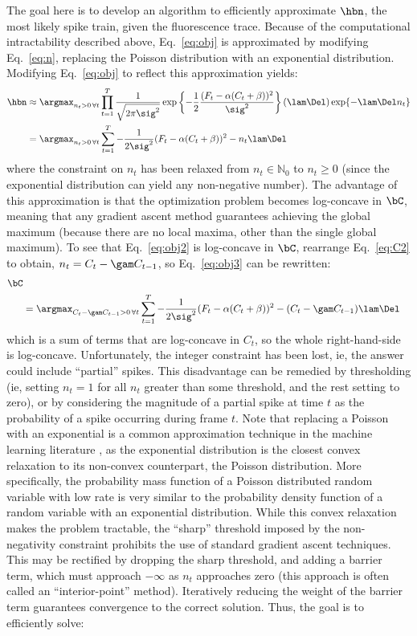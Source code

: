 The goal here is to develop an algorithm to efficiently approximate $\hbn$, the most likely spike train, given the fluorescence trace. Because of the computational intractability described above, Eq.~\eqref{eq:obj} is approximated by modifying Eq.~\eqref{eq:n}, replacing the Poisson distribution with an exponential distribution. Modifying Eq.~\eqref{eq:obj} to reflect this approximation yields:
\begin{subequations}
\begin{align} \label{eq:obj2}
\hbn &\approx \argmax_{n_t>0 \, \forall t} \prod_{t=1}^T  \frac{1}{\sqrt{2 \pi \sig^2}} \exp \left\{-\frac{1}{2}\frac{(F_t - \alpha (C_t + \beta))^2}{\sig^2}\right\}  (\lam\Del) \exp\{-\lam\Del n_t\}
\\ &= \argmax_{n_t>0 \, \forall t}  \sum_{t=1}^T -\frac{1}{2 \sig^2}(F_t - \alpha(C_t + \beta))^2  - n_t \lam \Del  \label{eq:obj3}
\end{align}
\end{subequations}
where the constraint on $n_t$ has been relaxed from  $n_t \in \mathbb{N}_0$ to $n_t \geq 0$ (since the exponential distribution can yield any non-negative number).  The advantage of this approximation is that the optimization problem becomes log-concave in $\bC$, meaning that any gradient ascent method guarantees achieving the global maximum (because there are no local maxima, other than the single global maximum).  To see that Eq.~\eqref{eq:obj2} is log-concave in $\bC$, rearrange Eq.~\eqref{eq:C2} to obtain, $n_t=C_t-\gam C_{t-1}$, so Eq.~\eqref{eq:obj3} can be rewritten:
\begin{align}
\bC\\ &= \argmax_{C_t-\gam C_{t-1}>0 \, \forall t}  \sum_{t=1}^T -\frac{1}{2 \sig^2}(F_t - \alpha(C_t + \beta))^2  - (C_t -\gam C_{t-1}) \lam \Del  \label{eq:obj3}
\end{align}
\noindent which is a sum of terms that are log-concave in $C_t$, so the whole right-hand-side is log-concave. Unfortunately, the integer constraint has been lost, ie, the answer could include ``partial'' spikes.  This disadvantage can be remedied by thresholding (ie, setting $n_t=1$ for all $n_t$ greater than some threshold, and the rest setting to zero), or by considering the magnitude of a partial spike at time $t$ as the probability of a spike occurring during frame $t$. Note that replacing a Poisson with an exponential is a common approximation technique in the machine learning literature \cite{CONV04, PaninskiWu09}, as the exponential distribution is the closest convex relaxation to its non-convex counterpart, the Poisson distribution. More specifically, the probability mass function of a Poisson distributed random variable with low rate is very similar to the probability density function of a random variable with an exponential distribution. While this convex relaxation makes the problem tractable, the ``sharp'' threshold imposed by the non-negativity constraint prohibits the use of standard gradient ascent techniques. This may be rectified by dropping the sharp threshold, and adding a barrier term, which must approach $-\infty$ as $n_t$ approaches zero (this approach is often called an ``interior-point'' method). Iteratively reducing the weight of the barrier term guarantees convergence to the correct solution.  Thus, the goal is to efficiently solve:
